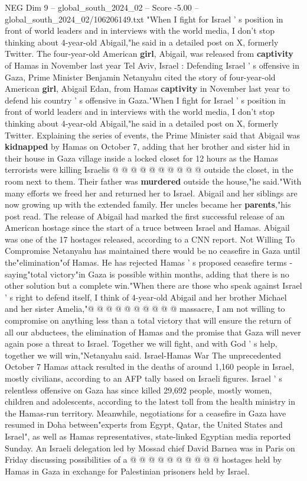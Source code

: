 \begin{textsample}{NEG Dim 9 – global\_south\_2024\_02 – Score -5.00 – global\_south\_2024\_02/106206149.txt}  \label{ex:f9_neg_345}
"When I fight for Israel ' s position in front of world leaders and in interviews with the world media, I don't stop thinking about 4-year-old Abigail,"he said in a detailed post on X, formerly Twitter.
The four-year-old American \textbf{girl}, Abigail, was released from \textbf{captivity} of Hamas in November last year Tel Aviv, Israel : Defending Israel ' s offensive in Gaza, Prime Minister Benjamin Netanyahu cited the story of four-year-old American \textbf{girl}, Abigail Edan, from Hamas \textbf{captivity} in November last year to defend his country ' s offensive in Gaza."When I fight for Israel ' s position in front of world leaders and in interviews with the world media, I don't stop thinking about 4-year-old Abigail,"he said in a detailed post on X, formerly Twitter.
Explaining the series of events, the Prime Minister said that Abigail was \textbf{kidnapped} by Hamas on October 7, adding that her brother and sister hid in their house in Gaza village inside a locked closet for 12 hours as the Hamas terrorists were killing Israelis @ @ @ @ @ @ @ @ @ @ outside the closet, in the room next to them.
Their father was \textbf{murdered} outside the house,"he said."With many efforts we freed her and returned her to Israel.
Abigail and her siblings are now growing up with the extended family.
Her uncles became her \textbf{parents},"his post read.
The release of Abigail had marked the first successful release of an American hostage since the start of a truce between Israel and Hamas.
Abigail was one of the 17 hostages released, according to a CNN report.
Not Willing To Compromise Netanyahu has maintained there would be no ceasefire in Gaza until the"elimination"of Hamas.
He has rejected Hamas ' s proposed ceasefire terms - saying"total victory"in Gaza is possible within months, adding that there is no other solution but a complete win."When there are those who speak against Israel ' s right to defend itself, I think of 4-year-old Abigail and her brother Michael and her sister Amelia,"@ @ @ @ @ @ @ @ @ @ massacre, I am not willing to compromise on anything less than a total victory that will ensure the return of all our abductees, the elimination of Hamas and the promise that Gaza will never again pose a threat to Israel.
Together we will fight, and with God ' s help, together we will win,"Netanyahu said.
Israel-Hamas War The unprecedented October 7 Hamas attack resulted in the deaths of around 1,160 people in Israel, mostly civilians, according to an AFP tally based on Israeli figures.
Israel ' s relentless offensive on Gaza has since killed 29,692 people, mostly women, children and adolescents, according to the latest toll from the health ministry in the Hamas-run territory.
Meanwhile, negotiations for a ceasefire in Gaza have resumed in Doha between"experts from Egypt, Qatar, the United States and Israel", as well as Hamas representatives, state-linked Egyptian media reported Sunday.
An Israeli delegation led by Mossad chief David Barnea was in Paris on Friday discussing possibilities of a @ @ @ @ @ @ @ @ @ @ hostages held by Hamas in Gaza in exchange for Palestinian prisoners held by Israel.

\end{textsample}
